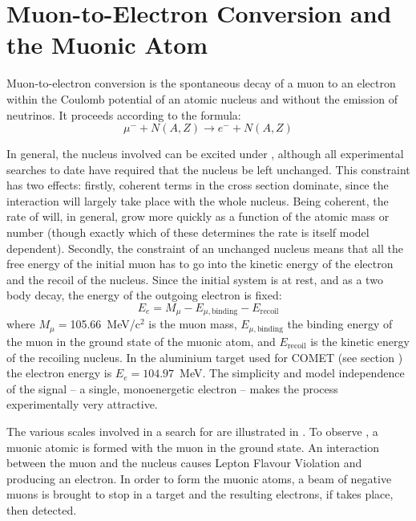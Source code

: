 
\chapter{Muon-to-Electron Conversion and the Muonic Atom}
Muon-to-electron conversion is the spontaneous decay of a muon to an electron within the Coulomb potential of an atomic nucleus and without the emission of neutrinos.
It proceeds according to the formula:
\begin{equation}
\mu^{-}+N(A,Z) \rightarrow e^{-}+N(A,Z)
\end{equation}

In general, the nucleus involved can be excited under \mueconv, although all experimental searches to date have required that the nucleus be left unchanged.
This constraint has two effects: firstly, coherent terms in the \mueconv cross section dominate, since the interaction will largely take place with the whole nucleus.
Being coherent, the rate of \mueconv will, in general, grow more quickly as a function of the atomic mass or number (though exactly which of these determines the rate is itself model dependent).
Secondly, the constraint of an unchanged nucleus means that all the free energy of the initial muon has to go into the kinetic energy of the electron and the recoil of the nucleus.
Since the initial system is at rest, and as a two body decay, the energy of the outgoing electron is fixed:
\begin{equation}
E_e=M_\mu-E_{\mu,\mathrm{binding}}-E_\mathrm{recoil}
\end{equation}
where $M_\mu=$105.66~MeV/c$^2$ is the muon mass, $E_{\mu,\mathrm{binding}}$ the
binding energy of the muon in the ground state of the muonic atom, and
$E_\mathrm{recoil}$ is the kinetic energy of the recoiling nucleus.
In the aluminium target used for COMET (see section ) the electron energy is $E_e=104.97$~MeV.
The simplicity and model independence of the signal -- a single, monoenergetic electron -- makes the process experimentally very attractive.

\FigMuecCreation
The various scales involved in a search for \mueconv are illustrated in .
To observe \mueconv, a muonic atomic is formed with the muon in the ground state.
An interaction between the muon and the nucleus causes Lepton Flavour Violation and producing an electron.
In order to form the muonic atoms, a beam of negative muons is brought to stop in a target and the resulting electrons, if \mueconv takes place, then detected.

